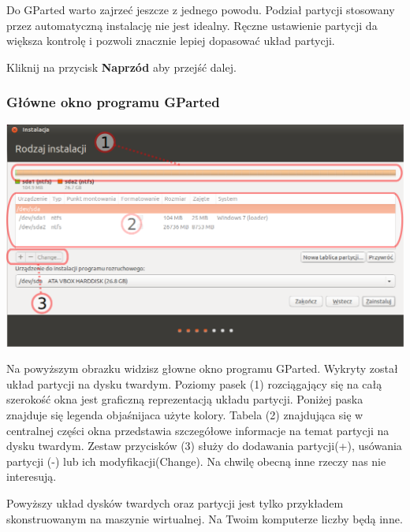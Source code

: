 Do GParted warto zajrzeć jeszcze z jednego powodu. Podział partycji stosowany przez automatyczną instalację nie jest idealny. Ręczne ustawienie partycji da większa kontrolę i pozwoli znacznie lepiej dopasować układ partycji.
\begin{flushright}
Kliknij na przycisk \textbf{Naprzód} aby przejść dalej.
\end{flushright}
\clearpage

\subsubsection{Główne okno programu GParted}
\begin{center}
	\includegraphics[scale=0.5]{images/instalator_partycjonowanie_gparted2.png}
\end{center}
Na powyższym obrazku widzisz głowne okno programu GParted. Wykryty został układ partycji na dysku twardym. Poziomy pasek (1) rozciągający się na całą szerokość okna jest graficzną reprezentacją układu partycji. Poniżej paska znajduje się legenda objaśnijaca użyte kolory. Tabela (2) znajdująca się w centralnej części okna przedstawia szczegółowe informacje na temat partycji na dysku twardym. Zestaw przycisków (3) służy do dodawania partycji(+), usówania partycji (-) lub ich modyfikacji(Change). Na chwilę obecną inne rzeczy nas nie interesują.

Powyższy układ dysków twardych oraz partycji jest tylko przykładem skonstruowanym na maszynie wirtualnej. Na Twoim komputerze liczby będą inne.

